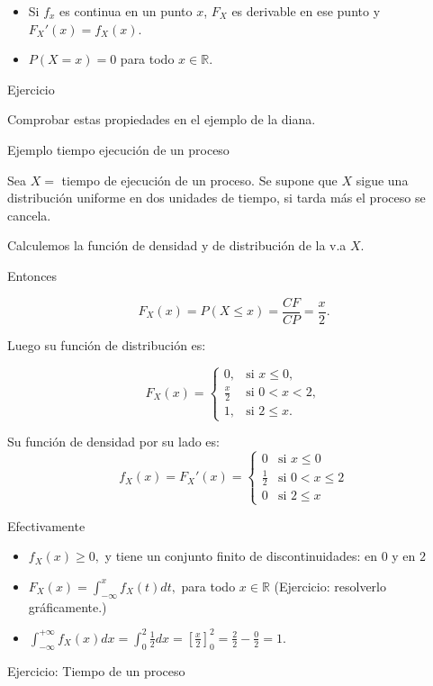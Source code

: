 \documentclass[
  letterpaper,
  DIV=11,
  numbers=noendperiod]{scrreprt}
\providecommand{\tightlist}{%
  \setlength{\itemsep}{0pt}\setlength{\parskip}{0pt}}\usepackage{longtable,booktabs,array}
\begin{document}
\begin{itemize}
\tightlist
\item
  Si \(f_x\) es continua en un punto \(x\), \(F_X\) es derivable en ese
  punto y \(F_X'(x)=f_X(x).\)
\item
  \(P(X=x)=0\) para todo \(x\in\mathbb{R}.\)
\end{itemize}

Ejercicio

Comprobar estas propiedades en el ejemplo de la diana.

Ejemplo tiempo ejecución de un proceso

Sea \(X=\) tiempo de ejecución de un proceso. Se supone que \(X\) sigue
una distribución uniforme en dos unidades de tiempo, si tarda más el
proceso se cancela.

Calculemos la función de densidad y de distribución de la v.a \(X\).

Entonces

\[
F_{X}(x)=P(X\leq x)=\frac{CF}{CP}=\frac{x}2.
\]

Luego su función de distribución es:

\[
F_{X}(x)=\left\{\begin{array}{ll}
0, & \mbox{si } x\leq 0,\\
\frac{x}2 & \mbox{si } 0<x<2,\\
1, & \mbox{si } 2\leq x.
\end{array}\right.
\]

Su función de densidad por su lado es: \[
f_{X}(x)=F_{X}'(x)=\left\{\begin{array}{ll}
0 & \mbox{si } x\leq 0\\
\frac12 & \mbox{si } 0<x\leq 2\\
0 & \mbox{si } 2\leq x
\end{array}\right.
\]

Efectivamente

\begin{itemize}
\tightlist
\item
  \(f_{X}(x)\geq 0,\) y tiene un conjunto finito de discontinuidades: en
  \(0\) y en \(2\)
\item
  \(F_X(x)=\displaystyle\int_{-\infty}^x f_X(t) dt,\) para todo
  \(x\in \mathbb{R}\) (Ejercicio: resolverlo gráficamente.)
\item
  \(\displaystyle\int_{-\infty}^{+\infty}f_{X}(x)dx=
  \int_0^2\frac12dx=\left[\frac{x}2\right]_0^2
  =\frac22-\frac02=1.\)
\end{itemize}

Ejercicio: Tiempo de un proceso
\end{document}
